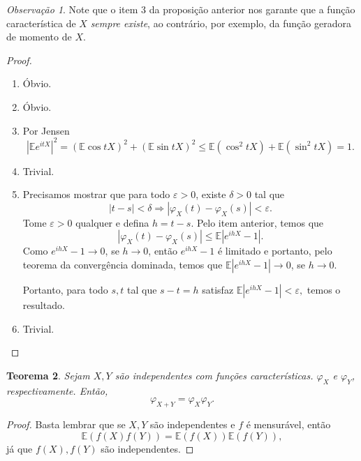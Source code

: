 \documentclass[12pt,a4paper,oneside]{book}
\newtheorem{theorem}{Teorema}[section]
\theoremstyle{definition}
\theoremstyle{remark}
\newtheorem{remark}[theorem]{Observa\c{c}\~ao}
\numberwithin{equation}{section}
\newcommand{\e}{\varepsilon}
\newcommand{\E}{\mathbb{E}}
\begin{document}
\begin{tcolorbox}[colback = yellow!60]
\begin{remark}
Note que o item 3 da proposição anterior nos garante que a função característica de $X$ \emph{sempre existe}, ao contrário, por exemplo, da função geradora de momento de $X$.
\end{remark}
\end{tcolorbox}



\begin{proof}
$ $

\begin{enumerate}
\item  Óbvio.
\item Óbvio.
\item Por Jensen
$$|\E e^{itX}|^2 = (\E\cos tX)^2 + (\E\sin tX)^2\leq \E(\cos^2 tX) + \E(\sin^2 tX)=1. $$
\item Trivial.
\item Precisamos mostrar que para todo $\e>0$, existe $\delta>0$ tal que
$$|t-s|< \delta \Rightarrow |\varphi_X(t)-\varphi_X(s)|<\e. $$
Tome $\e>0$ qualquer e defina $h = t-s$. Pelo item anterior, temos que
$$|\varphi_X(t)-\varphi_X(s)| \leq \E|e^{ihX}-1|. $$
Como $e^{ihX}-1 \rightarrow 0$, se $h\rightarrow 0$, então $e^{ihX}-1$ é limitado e portanto, pelo teorema da convergência dominada, temos que 
$\E|e^{ihX}-1|\rightarrow 0$, se $h\rightarrow 0.$

Portanto, para todo $s,t$ tal que $s-t = h$ satisfaz $\E|e^{ihX}-1|< \e,$ temos o resultado.

\item Trivial.

\end{enumerate}
\end{proof}



\begin{theorem} Sejam $X,Y$ são independentes com funções características. $\varphi_X$ e $\varphi_Y$, respectivamente. Então,  
$$\varphi_{X+Y}  = \varphi_X\varphi_Y .$$
\end{theorem}

\begin{proof}
Basta lembrar que se $X,Y$ são independentes e $f$ é mensurável, então
$$\E(f(X)f(Y)) = \E(f(X))\E(f(Y)), $$
já que $f(X),f(Y)$ são independentes.
\end{proof}
\end{document}
